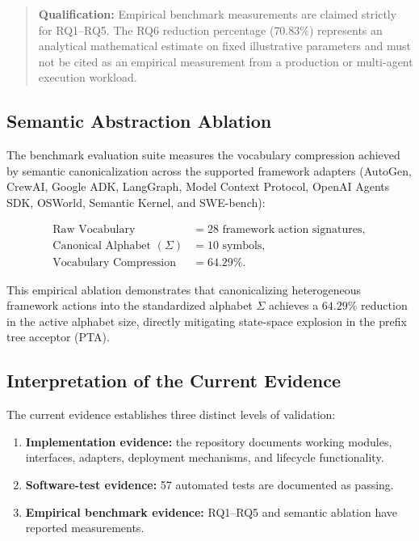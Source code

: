 \documentclass[11pt,a4paper]{article}
\begin{document}
\begin{quote}
\textbf{Qualification:} Empirical benchmark measurements are claimed strictly for
RQ1--RQ5. The RQ6 reduction percentage ($70.83\%$) represents an analytical mathematical
estimate on fixed illustrative parameters and must not be cited as an empirical measurement
from a production or multi-agent execution workload.
\end{quote}

\subsection{Semantic Abstraction Ablation}

The benchmark evaluation suite measures the vocabulary compression achieved by semantic
canonicalization across the supported framework adapters (AutoGen, CrewAI, Google ADK,
LangGraph, Model Context Protocol, OpenAI Agents SDK, OSWorld, Semantic Kernel, and SWE-bench):

\[
\begin{aligned}
\text{Raw Vocabulary} &= 28 \text{ framework action signatures}, \\
\text{Canonical Alphabet } (\Sigma) &= 10 \text{ symbols}, \\
\text{Vocabulary Compression} &= \mathbf{64.29\%}.
\end{aligned}
\]

This empirical ablation demonstrates that canonicalizing heterogeneous framework actions into
the standardized alphabet $\Sigma$ achieves a $64.29\%$ reduction in the active alphabet size,
directly mitigating state-space explosion in the prefix tree acceptor (PTA).

\subsection{Interpretation of the Current Evidence}

The current evidence establishes three distinct levels of validation:

\begin{enumerate}
\item \textbf{Implementation evidence:} the repository documents working modules,
interfaces, adapters, deployment mechanisms, and lifecycle functionality.

\item \textbf{Software-test evidence:} 57 automated tests are documented as passing.

\item \textbf{Empirical benchmark evidence:} RQ1--RQ5 and semantic ablation have reported measurements.
\end{enumerate}
\end{document}

